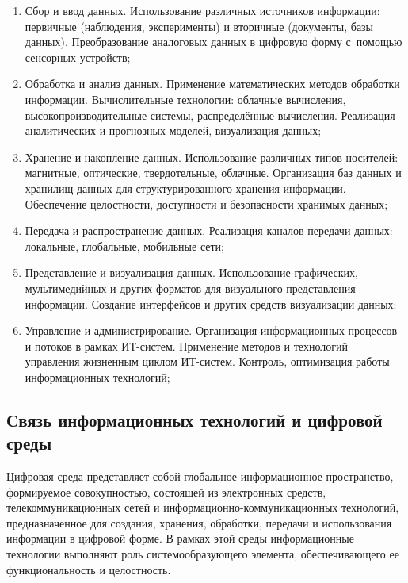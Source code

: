 \documentclass{ou}
\begin{document}
\begin{enumerate}[itemindent=4em, nosep, label=\arabic*)]
    \item Сбор и ввод данных. Использование различных источников информации: первичные (наблюдения, эксперименты) и вторичные (документы, базы данных). Преобразование аналоговых данных в цифровую форму с~помощью сенсорных устройств;

    \item Обработка и анализ данных. Применение математических методов обработки информации. Вычислительные технологии: облачные вычисления, высокопроизводительные системы, распределённые вычисления. Реализация аналитических и прогнозных моделей, визуализация данных;

    \item Хранение и накопление данных. Использование различных типов носителей: магнитные, оптические, твердотельные, облачные. Организация баз данных и хранилищ данных для структурированного хранения информации. Обеспечение целостности, доступности и безопасности хранимых данных;

    \item Передача и распространение данных. Реализация каналов передачи данных: локальные, глобальные, мобильные сети;

    \item Представление и визуализация данных. Использование графических, мультимедийных и других форматов для визуального представления информации. Создание интерфейсов и других средств визуализации данных;

    \item Управление и администрирование. Организация информационных процессов и потоков в рамках ИТ-систем. Применение методов и технологий управления жизненным циклом ИТ-систем. Контроль, оптимизация работы информационных технологий;
\end{enumerate}
\subsection{Связь информационных технологий и цифровой среды}
Цифровая среда представляет собой глобальное информационное пространство, формируемое совокупностью, состоящей из электронных средств, телекоммуникационных сетей и информационно-коммуникационных технологий, предназначенное для создания, хранения, обработки, передачи и использования информации в цифровой форме. В рамках этой среды информационные технологии выполняют роль системообразующего элемента, обеспечивающего ее функциональность и целостность.
\end{document}

